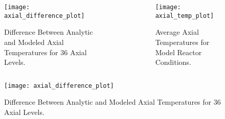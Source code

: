 \begin{frame}
  \begin{columns}
    \begin{column}{0.5\textwidth}
      \begin{figure}
        \centering
        \texttt{[image: axial\_difference\_plot]}
        \caption{Difference Between Analytic and Modeled Axial Temperatures for 36
          Axial Levels.}
        \label{fig:axial_difference_plot}
      \end{figure}
    \end{column}
    \begin{column}{0.5\textwidth}
      \begin{figure}
        \centering
        \texttt{[image: axial\_temp\_plot]}
        \caption{Average Axial Temperatures for Model Reactor Conditions.}
        \label{fig:axial_temp_plot}
      \end{figure}
    \end{column}
  \end{columns}
\end{frame}

\begin{frame}
  \begin{figure}
    \centering
    \texttt{[image: axial\_difference\_plot]}
    \caption{Difference Between Analytic and Modeled Axial Temperatures for 36
      Axial Levels.}
    \label{fig:axial_difference_plot}
  \end{figure}
\end{frame}
